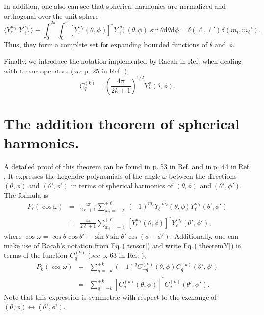 \documentclass[]{interact}
\def\refe#1{{\color{blue}\textsf{Eq.}\,(\ref{#1})}}
\def\d{\mathrm{d}}
\renewcommand{\l}{\ell}
\begin{document}
In addition, one also can see that spherical harmonics are normalized and orthogonal over the unit sphere
\begin{equation}
 \langle Y_{\l}^{m_\l}|Y_{\l'}^{m_\l'}\rangle \equiv \int_0^{2\pi}\int_0^{\pi}[Y_{\l}^{m_\l}(\theta,\phi)]^*Y_{\l'}^{m_\l'}(\theta,\phi)\sin\theta\d\theta\d\phi=\delta(\l,\l')\delta(m_\l,m_\l').
\end{equation}
Thus, they form a complete set for expanding bounded functions of $\theta$ and $\phi$.

Finally, we introduce the notation implemented by Racah in Ref. \cite{Racah} when dealing with tensor operators (\emph{see}  p. 25 in  Ref. \cite{Edmonds}), 
\begin{equation}
\label{tensor}
 C_q^{(k)}=\left(\frac{4\pi}{2k+1}\right)^{1/2} Y_{k}^{q}(\theta,\phi).
\end{equation}


\section*{The addition theorem of spherical harmonics.}

A detailed proof of this theorem can be found in p. 53 in Ref. \cite{Condon} and in p. 44 in Ref. \cite{Cowan}. It expresses the Legendre polynomials of the angle $\omega$ between the directions $(\theta,\phi)$ and $(\theta',\phi')$ in terms of spherical harmonics of $(\theta,\phi)$ and $(\theta',\phi')$. The formula is 
\begin{equation}
\label{theoremY}
\begin{array}{rll}
 P_\l(\cos\omega)&=&\frac{4\pi}{2\l+1}\sum_{m_\l=-\l}^{+\l}(-1)^{m_\l}Y_{\l}^{-m_\l}(\theta,\phi)Y_{\l}^{m_\l}(\theta',\phi')\\
 &=&\frac{4\pi}{2\l+1}\sum_{m_\l=-\l}^{+\l}[Y_{\l}^{m_\l}(\theta,\phi)]^*Y_{\l}^{m_\l}(\theta',\phi'),
\end{array}
\end{equation}
where $\cos\omega=\cos\theta\cos\theta'+\sin\theta\sin\theta'\cos(\phi-\phi')$.
Additionally, one can make use of Racah's notation from \refe{tensor} and write \refe{theoremY} in terms of the function $C_q^{(k)}$ (\emph{see}  p. 63 in Ref. \cite{Edmonds}),
\begin{equation}
 \begin{array}{rll}
 \label{theoremC}
 P_k(\cos\omega)&=&\sum_{q=-k}^{+k}(-1)^{q}C_{-q}^{(k)}(\theta,\phi)C_{q}^{(k)}(\theta',\phi')\\
 &=&\sum_{q=-k}^{+k}[C_{q}^{(k)}(\theta,\phi)]^*C_{q}^{(k)}(\theta',\phi').
\end{array}
\end{equation}
Note that this expression is symmetric with respect to the exchange of $(\theta,\phi)\leftrightarrow(\theta',\phi')$.
\end{document}
